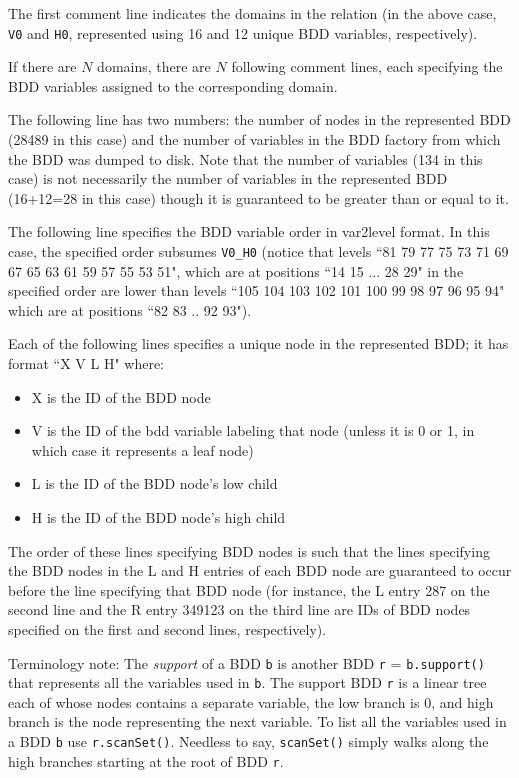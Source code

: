 The first comment line indicates the domains in the relation (in the above case, {\tt V0} and {\tt H0},
represented using 16 and 12 unique BDD variables, respectively).

If there are $N$ domains, there are $N$ following comment lines, each specifying the
BDD variables assigned to the corresponding domain.

The following line has two numbers: the number of nodes in the represented BDD (28489 in this case) and the number of variables
in the BDD factory from which the BDD was dumped to disk.  Note that the number of variables (134 in this case) is not
necessarily the number of variables in the represented BDD (16+12=28 in this case) though it is guaranteed to be
greater than or equal to it.

The following line specifies the BDD variable order in var2level format.  In this case, the specified order subsumes
{\tt V0\_H0} (notice that levels ``81 79 77 75 73 71 69 67 65 63 61 59 57 55 53 51", which are at positions ``14 15 ... 28 29" 
in the specified order are lower than levels ``105 104 103 102 101 100 99 98 97 96 95 94" which are at positions
``82 83 .. 92 93"). 

Each of the following lines specifies a unique node in the represented BDD; it has format ``X V L H" where:
\begin{itemize}
\item X is the ID of the BDD node
\item V is the ID of the bdd variable labeling that node (unless it is 0 or 1, in which case it represents a leaf node)
\item L is the ID of the BDD node's low child
\item H is the ID of the BDD node's high child
\end{itemize}

The order of these lines specifying BDD nodes is such that the lines specifying the BDD nodes in the L and H entries
of each BDD node are guaranteed to occur before the line specifying that BDD node (for instance, the L entry 287 on
the second line and the R entry 349123 on the third line are IDs of BDD nodes specified on the first and second lines,
respectively).

Terminology note:
The {\it support} of a BDD {\tt b} is another BDD {\tt r} = {\tt b.support()}
that represents all the variables used in {\tt b}.
The support BDD {\tt r} is a linear tree each of whose nodes contains a separate variable,
the low branch is 0, and high branch is the node representing the next variable.
To list all the variables used in a BDD {\tt b} use {\tt r.scanSet()}.
Needless to say, {\tt scanSet()} simply walks along the high branches
starting at the root of BDD {\tt r}.

